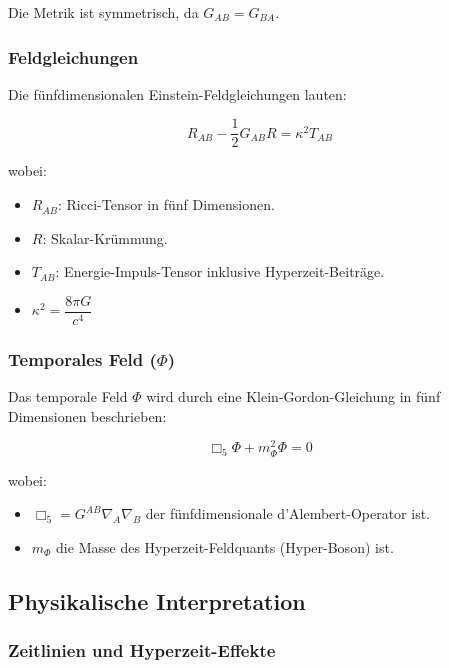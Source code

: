 \documentclass[11pt,a4paper]{article}
\begin{document}
Die Metrik ist symmetrisch, da $G_{AB} = G_{BA}$.

\subsubsection{Feldgleichungen}

Die fünfdimensionalen Einstein-Feldgleichungen lauten:

\begin{equation}
R_{AB} - \frac{1}{2} G_{AB} R = \kappa^2 T_{AB}
\end{equation}

wobei:

\begin{itemize}
    \item $R_{AB}$: Ricci-Tensor in fünf Dimensionen.
    \item $R$: Skalar-Krümmung.
    \item $T_{AB}$: Energie-Impuls-Tensor inklusive Hyperzeit-Beiträge.
    \item $\kappa^2 = \dfrac{8\pi G}{c^4}$
\end{itemize}

\subsubsection{Temporales Feld ($\Phi$)}

Das temporale Feld $\Phi$ wird durch eine Klein-Gordon-Gleichung in fünf Dimensionen beschrieben:

\begin{equation}
\Box_5 \Phi + m_\Phi^2 \Phi = 0
\end{equation}

wobei:

\begin{itemize}
    \item $\Box_5 = G^{AB} \nabla_A \nabla_B$ der fünfdimensionale d'Alembert-Operator ist.
    \item $m_\Phi$ die Masse des Hyperzeit-Feldquants (Hyper-Boson) ist.
\end{itemize}

\subsection{Physikalische Interpretation}

\subsubsection{Zeitlinien und Hyperzeit-Effekte}
\end{document}
